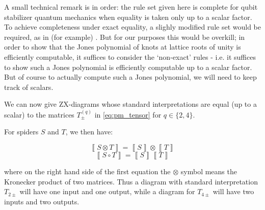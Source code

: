 \documentclass[submission,copyright,creativecommons]{eptcs}
\begin{document}
\begin{remark}\label{rem:qubit_scalar_exactness} 
	A small technical remark is in order: the rule set given here is complete for qubit stabilizer quantum mechanics when equality is taken only up to a scalar factor. To achieve completeness under exact equality, a slighly modified rule set would be required, as in (for example) \cite{backens_scalar_exact}. But for our purposes this would be overkill; in order to show that the Jones polynomial of knots at lattice roots of unity is efficiently computable, it suffices to consider the `non-exact' rules - i.e. it suffices to show such a Jones polynomial is efficiently computable up to a scalar factor. But of course to actually compute such a Jones polynomial, we will need to keep track of scalars.
\end{remark}

We can now give ZX-diagrams whose standard interpretations are equal (up to a scalar) to the matrices $T_{\pm}^{(q)}$ in \eqref{eq:pm_tensor} for $q \in \{2, 4\}$.



For spiders $S$ and $T$, we then have:

\begin{equation}
	\left\llbracket S \otimes T \right\rrbracket = \left\llbracket S \right\rrbracket \otimes \left\llbracket T \right\rrbracket 
\end{equation} 
\begin{equation}	
	\left\llbracket S \circ T \right\rrbracket = \left\llbracket S \right\rrbracket \left\llbracket T \right\rrbracket 
\end{equation} 

where on the right hand side of the first equation the $\otimes$ symbol means the Kronecker product of two matrices. Thus a diagram with standard interpretation $T_{2\pm}$ will have one input and one output, while a diagram for $T_{4\pm}$ will have two inputs and two outputs.
\end{document}
